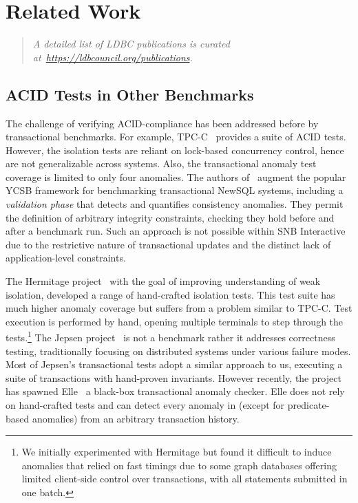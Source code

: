 \chapter{Related Work}
\label{sec:related-work}

\begin{quote}
    \textit{A detailed list of LDBC publications is curated at~\url{https://ldbcouncil.org/publications}.}
\end{quote}


\section{ACID Tests in Other Benchmarks}

The challenge of verifying ACID-compliance has been addressed before by transactional benchmarks.
For example, TPC-C~\cite{tpcc} provides a suite of ACID tests.
However, the isolation tests are reliant on lock-based concurrency control, hence are not generalizable across systems.
Also, the transactional anomaly test coverage is limited to only four anomalies.
The authors of~\cite{DBLP:conf/icde/DeyFNR14} augment the popular YCSB framework for benchmarking transactional NewSQL systems, including a \emph{validation phase} that detects and quantifies consistency anomalies.
They permit the definition of arbitrary integrity constraints, checking they hold before and after a benchmark run.
Such an approach is not possible within SNB Interactive due to the restrictive nature of transactional updates and the distinct lack of application-level constraints.

The Hermitage project~\cite{Hermitage} with the goal of improving understanding of weak isolation, developed a range of hand-crafted isolation tests.
This test suite has much higher anomaly coverage but suffers from a problem similar to TPC-C.
Test execution is performed by hand, opening multiple terminals to step through the tests.\footnote{We initially experimented with Hermitage but found it difficult to induce anomalies that relied on fast timings due to some graph databases offering limited client-side control over transactions, with all statements submitted in one batch.}
The Jepsen project~\cite{kingsbury} is not a benchmark rather it addresses correctness testing, traditionally focusing on distributed systems under various failure modes.
Most of Jepsen's transactional tests adopt a similar approach to us, executing a suite of transactions with hand-proven invariants.
However recently, the project has spawned Elle~\cite{DBLP:journals/corr/abs-2003-10554} a black-box transactional anomaly checker.
Elle does not rely on hand-crafted tests and can detect every anomaly in \cite{adya1999weak} (except for predicate-based anomalies) from an arbitrary transaction history.

